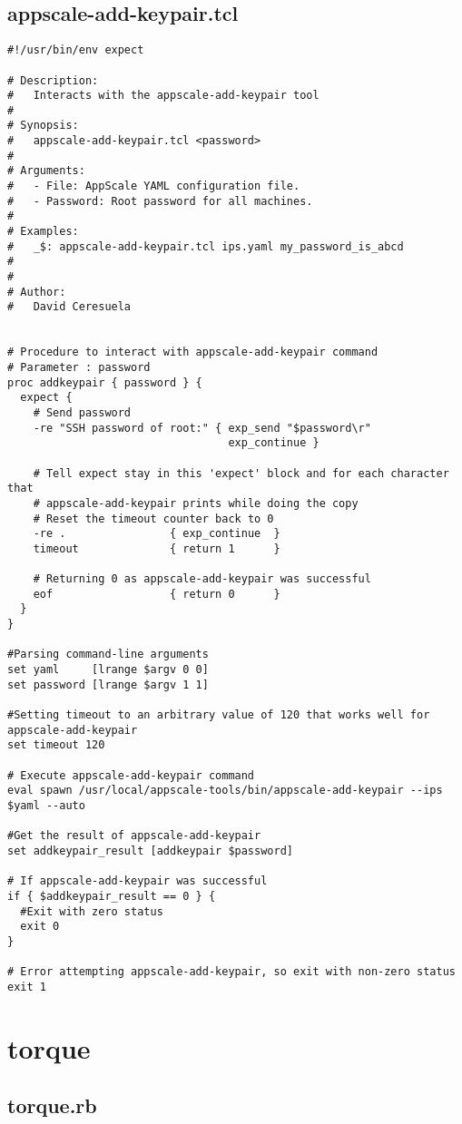 \subsection{appscale-add-keypair.tcl}


\begin{lstlisting}
#!/usr/bin/env expect

# Description:
#   Interacts with the appscale-add-keypair tool
#
# Synopsis:
#   appscale-add-keypair.tcl <password>
#
# Arguments:
#   - File: AppScale YAML configuration file.
#   - Password: Root password for all machines.
#
# Examples:
#   _$: appscale-add-keypair.tcl ips.yaml my_password_is_abcd
#
#
# Author:
#   David Ceresuela


# Procedure to interact with appscale-add-keypair command
# Parameter : password 
proc addkeypair { password } {
  expect {
    # Send password
    -re "SSH password of root:" { exp_send "$password\r"
                                  exp_continue }
    
    # Tell expect stay in this 'expect' block and for each character that
    # appscale-add-keypair prints while doing the copy
    # Reset the timeout counter back to 0
    -re .                { exp_continue  }
    timeout              { return 1      }
    
    # Returning 0 as appscale-add-keypair was successful
    eof                  { return 0      }
  }
}

#Parsing command-line arguments
set yaml     [lrange $argv 0 0]
set password [lrange $argv 1 1]

#Setting timeout to an arbitrary value of 120 that works well for appscale-add-keypair
set timeout 120

# Execute appscale-add-keypair command
eval spawn /usr/local/appscale-tools/bin/appscale-add-keypair --ips $yaml --auto

#Get the result of appscale-add-keypair
set addkeypair_result [addkeypair $password]

# If appscale-add-keypair was successful
if { $addkeypair_result == 0 } {
  #Exit with zero status
  exit 0
}

# Error attempting appscale-add-keypair, so exit with non-zero status
exit 1
\end{lstlisting}


\section{torque}
\subsection{torque.rb}


